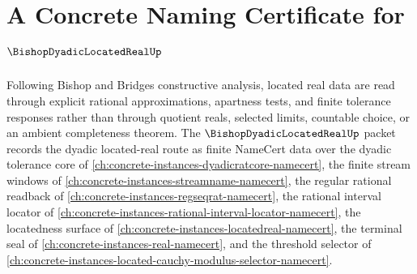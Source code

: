 \chapter{A Concrete Naming Certificate for $\BishopDyadicLocatedRealUp$}
\label{ch:concrete-instances-bishop-dyadic-located-real-namecert}

Following Bishop and Bridges constructive analysis, located real data are read through explicit rational approximations, apartness tests, and finite tolerance responses rather than through quotient reals, selected limits, countable choice, or an ambient completeness theorem. The $\BishopDyadicLocatedRealUp$ packet records the dyadic located-real route as finite NameCert data over the dyadic tolerance core of \autoref{ch:concrete-instances-dyadicratcore-namecert}, the finite stream windows of \autoref{ch:concrete-instances-streamname-namecert}, the regular rational readback of \autoref{ch:concrete-instances-regseqrat-namecert}, the rational interval locator of \autoref{ch:concrete-instances-rational-interval-locator-namecert}, the locatedness surface of \autoref{ch:concrete-instances-locatedreal-namecert}, the terminal seal of \autoref{ch:concrete-instances-real-namecert}, and the threshold selector of \autoref{ch:concrete-instances-located-cauchy-modulus-selector-namecert}.

